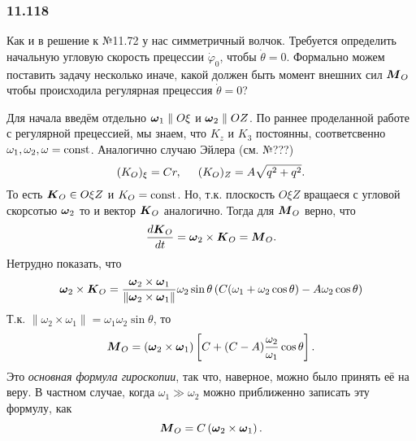 \subsubsection*{11.118}

Как и в решение к №11.72 у нас симметричный волчок. Требуется определить начальную угловую скорость прецессии $\dot{\varphi}_0$, чтобы $\dot{\theta}=0$. 
Формально можем поставить задачу несколько иначе, какой должен быть момент внешних сил $\mbox{\boldmath $M$}_O$ чтобы происходила регулярная прецессия $\dot{\theta}=0$?

Для начала введём отдельно $\mbox{\boldmath $\omega$}_1 \parallel O\xi$ и $\mbox{\boldmath $\omega$}_2 \parallel OZ$.
 По раннее проделанной работе с регулярной прецессией, мы знаем, что $K_z$ и $K_3$ постоянны, соответсвенно $\omega_1, \omega_2, \omega = \text{const}$.
 Аналогично случаю Эйлера (см. №???)
 \begin{equation*}
     (K_O)_\xi = Cr, \hspace{0.5cm} (K_O)_Z = A \sqrt{q^2 + q^2}.
 \end{equation*}
 То есть $\mbox{\boldmath $K$}_O \in O\xi Z$ и $K_O=\text{const}$. Но, т.к. плоскость $O\xi Z$ вращаеся с угловой скорсотью $\mbox{\boldmath $\omega$}_2$ то и вектор $\mbox{\boldmath $K$}_O$ аналогично. Тогда для $\mbox{\boldmath $M$}_O$ верно, что
 \begin{equation}
     \frac{d \mbox{\boldmath $K$}_O}{d t} = \mbox{\boldmath $\omega$}_2 \times \mbox{\boldmath $K$}_O = \mbox{\boldmath $M$}_O.
 \end{equation}
 Нетрудно показать, что
 \begin{equation*}
     \mbox{\boldmath $\omega$}_2 \times \mbox{\boldmath $K$}_O = 
     \frac{\mbox{\boldmath $\omega$}_2\times \mbox{\boldmath $\omega$}_1}{\|\mbox{\boldmath $\omega$}_2\times \mbox{\boldmath $\omega$}_1\|} \omega_2 \sin \theta
     \left(
        C (\omega_1 + \omega_2 \cos \theta) - A \omega_2 \cos \theta
     \right) 
 \end{equation*}
 Т.к. $\|\omega_2 \times \omega_1\| = \omega_1 \omega_2 \sin \theta$, то
 \begin{equation}
 \label{ggg}
    \mbox{\boldmath $M$}_O = 
     (\mbox{\boldmath $\omega$}_2 \times \mbox{\boldmath $\omega$}_1) \left[
        C + (C-A) \frac{\omega_2}{\omega_1} \cos \theta
     \right].
 \end{equation}
 Это \textit{основная формула гироскопии}, так что, наверное, можно было принять её на веру. В частном случае, когда $\omega_1 \gg \omega_2$ можно приближенно записать эту формулу, как
 \begin{equation}
     \mbox{\boldmath $M$}_O = C \left(\mbox{\boldmath $\omega$}_2 \times \mbox{\boldmath $\omega$}_1\right).
 \end{equation}

